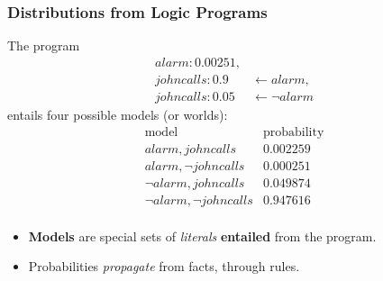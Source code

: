\documentclass[bigger,xcolor={x11names,svgnames}]{beamer}
\begin{document}
\begin{frame}
    \frametitle{Distributions from Logic Programs}
    \vfill
    The program
    $$
        \begin{aligned}
            alarm:0.00251, &                       \\
            johncalls:0.9  & \leftarrow alarm,     \\
            johncalls:0.05 & \leftarrow \neg alarm
        \end{aligned}
    $$
    entails four possible models (or worlds):
    $$
        \begin{array}{r|r}
            \text{model}               & \text{probability} \\
            \hline
            alarm, johncalls           & 0.002259   \\
            alarm, \neg johncalls      & 0.000251   \\
            \neg alarm, johncalls      & 0.049874   \\
            \neg alarm, \neg johncalls & 0.947616   \\
        \end{array}
    $$
    \begin{itemize}
        \item \alert{\textbf{Models}} are special sets of \emph{literals} \textbf{entailed} from the program.
        \item Probabilities \emph{propagate} from facts, through rules.
    \end{itemize}
    \vfill
\end{frame}
%
\end{document}
